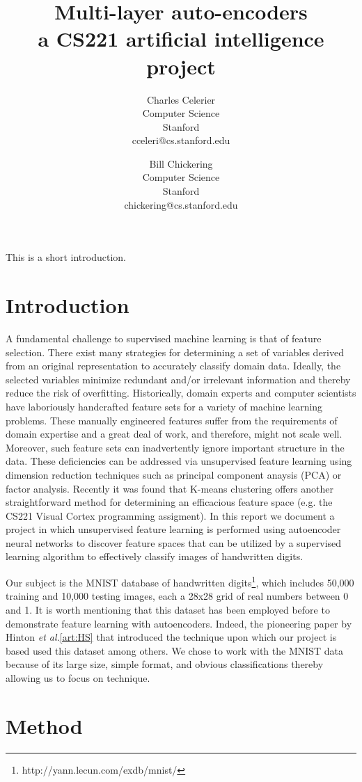 \documentclass{article}
\title{Multi-layer auto-encoders \\
    \large{a CS221 artificial intelligence project}}
\author{
    Charles Celerier \\
    Computer Science \\
    Stanford \\
    cceleri@cs.stanford.edu
  \and
    Bill Chickering \\
    Computer Science \\
    Stanford \\
    chickering@cs.stanford.edu
}
\begin{document}
\maketitle

This is a short introduction.

\section{Introduction}\label{sec:introduction}

A fundamental challenge to supervised machine learning is that of feature selection. There exist many strategies for determining a set of variables derived from an original representation to accurately classify domain data. Ideally, the selected variables minimize redundant and/or irrelevant information and thereby reduce the risk of overfitting. Historically, domain experts and computer scientists have laboriously handcrafted feature sets for a variety of machine learning problems. These manually engineered features suffer from the requirements of domain expertise and a great deal of work, and therefore, might not scale well. Moreover, such feature sets can inadvertently ignore important structure in the data. These deficiencies can be addressed via unsupervised feature learning using dimension reduction techniques such as principal component anaysis (PCA) or factor analysis. Recently it was found that K-means clustering offers another straightforward method for determining an efficacious feature space (e.g. the CS221 Visual Cortex programming assigment). In this report we document a project in which unsupervised feature learning is performed using autoencoder neural networks to discover feature spaces that can be utilized by a supervised learning algorithm to effectively classify images of handwritten digits.

Our subject is the MNIST database of handwritten digits\footnote{http://yann.lecun.com/exdb/mnist/}, which includes 50,000 training and 10,000 testing images, each a 28x28 grid of real numbers between 0 and 1. It is worth mentioning that this dataset has been employed before to demonstrate feature learning with autoencoders. Indeed, the pioneering paper by Hinton {\em et al.}\ref{art:HS} that introduced the technique upon which our project is based used this dataset among others. We chose to work with the MNIST data because of its large size, simple format, and obvious classifications thereby allowing us to focus on technique.

\section{Method}\label{sec:method}
\end{document}
